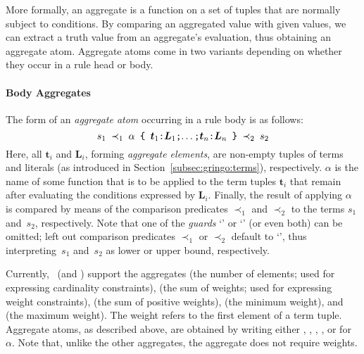 More formally,
an aggregate is a function on a set of tuples that are normally subject to conditions.
By comparing an aggregated value with given values, we can extract a truth value from an aggregate's evaluation,
thus
obtaining an aggregate atom.
Aggregate atoms come in two variants depending on whether they occur in a rule head or body.

\paragraph{Body Aggregates}
The form of an \emph{aggregate atom} occurring in a rule body is as follows:
%
\[\texttt{$s_1$~$\prec_1$~$\alpha$~\{~$\boldsymbol{t}_1$:$\boldsymbol{L}_1$;$\dots$;$\boldsymbol{t}_n$:$\boldsymbol{L}_n$ \}~$\prec_2$~$s_2$}\]
%
Here, all $\boldsymbol{t}_i$ and $\boldsymbol{L}_i$, forming \emph{aggregate elements}, are non-empty tuples of terms and literals
(as introduced in Section~\ref{subsec:gringo:terms}), respectively.
$\alpha$ is the name of some function that is to be applied to the term tuples $\boldsymbol{t}_i$
that remain after evaluating the conditions expressed by $\boldsymbol{L}_i$.
%
Finally,
the result of applying $\alpha$ is compared by means of the comparison predicates $\prec_1$ and $\prec_2$
to the terms $s_1$ and~$s_2$, respectively.
Note that one of the \emph{guards} `' or `'
(or even both) can be omitted;
left out comparison predicates $\prec_1$ or $\prec_2$ default to `\code{<=}',
thus interpreting~$s_1$ and~$s_2$ as lower or upper bound, respectively.

Currently, \gringo\ (and \clingo) support the aggregates
%
(the number of elements; used for expressing cardinality constraints),
%
(the sum of weights; used for expressing weight constraints),
%
(the sum of positive weights),
%
(the minimum weight), and
%
(the maximum weight).
The weight refers to the first element of a term tuple.
Aggregate atoms, as described above, are obtained by writing
either , , , , or  for~$\alpha$.
%
Note that, unlike the other aggregates, the  aggregate does not require weights.

